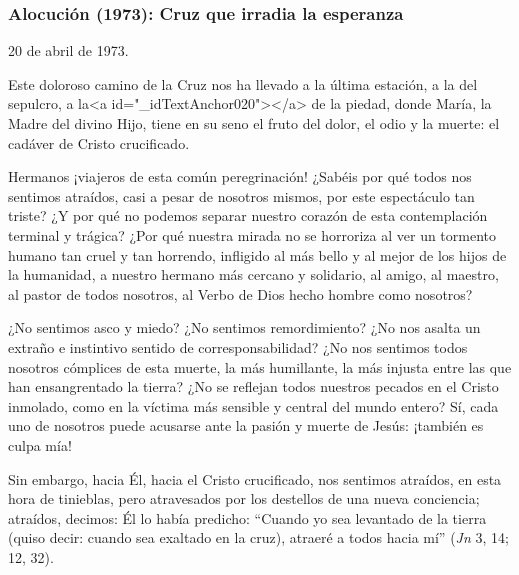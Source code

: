			\subsubsection{Alocución (1973): Cruz que irradia la esperanza}
			
			\begin{referencia}20 de abril de 1973. \end{referencia}
			
			\begin{body}Este doloroso camino de la Cruz nos ha llevado a la última estación, a la del sepulcro, a la<a id="_idTextAnchor020"></a> de la piedad, donde María, la Madre del divino Hijo, tiene en su seno el fruto del dolor, el odio y la muerte: el cadáver de Cristo crucificado. \end{body}
			
			\begin{body}Hermanos ¡viajeros de esta común peregrinación! ¿Sabéis por qué todos nos sentimos atraídos, casi a pesar de nosotros mismos, por este espectáculo tan triste? ¿Y por qué no podemos separar nuestro corazón de esta contemplación terminal y trágica? ¿Por qué nuestra mirada no se horroriza al ver un tormento humano tan cruel y tan horrendo, infligido al más bello y al mejor de los hijos de la humanidad, a nuestro hermano más cercano y solidario, al amigo, al maestro, al pastor de todos nosotros, al Verbo de Dios hecho hombre como nosotros? \end{body}
			
			\begin{body}¿No sentimos asco y miedo? ¿No sentimos remordimiento? ¿No nos asalta un extraño e instintivo sentido de corresponsabilidad? ¿No nos sentimos todos nosotros cómplices de esta muerte, la más humillante, la más injusta entre las que han ensangrentado la tierra? ¿No se reflejan todos nuestros pecados en el Cristo inmolado, como en la víctima más sensible y central del mundo entero? Sí, cada uno de nosotros puede acusarse ante la pasión y muerte de Jesús: ¡también es culpa mía! \end{body}
			
			\begin{body}Sin embargo, hacia Él, hacia el Cristo crucificado, nos sentimos atraídos, en esta hora de tinieblas, pero atravesados por los destellos de una nueva conciencia; atraídos, decimos: Él lo había predicho: “Cuando yo sea levantado de la tierra (quiso decir: cuando sea exaltado en la cruz), atraeré a todos hacia mí” (\textit{Jn} 3, 14; 12, 32).\end{body}
			
